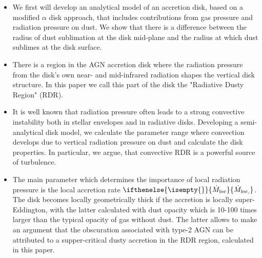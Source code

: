 \documentclass[12pt,english,preprint]{aastex}
\newcommand{\mdt}[1][]{ 
  \ifthenelse{\isempty{#1}}
  {\dot{M}_{\rm loc}}
  { {\dot M}_{\rm{loc},{#1}} } 
  } %
\begin{document}
\begin{itemize}
    \item  We first will develop an analytical model of an accretion disk, based on a modified 
    $\alpha$ disk approach, that includes  contributions from gas pressure 
    and radiation pressure on dust.   We show that there is a difference between the  
    radius of dust sublimation at the disk mid-plane and the radius at which dust 
    sublimes at the disk surface.  

    \item There is a region in the AGN accretion disk where the radiation pressure from the disk's own near- and mid-infrared 
    radiation shapes the vertical disk structure. In this paper we call this part of the disk the "Radiative Dusty Region" (RDR).

    \item It is well known that radiation pressure often leads to a strong convective instability both in stellar envelopes 
    and in radiative disks.   Developing a semi-analytical disk model,
    we calculate the parameter range where convection develops due to vertical radiation pressure on dust and calculate 
    the disk properties. In particular, we argue, that convective RDR is a powerful source of turbulence.

    \item The main parameter which determines the importance of local radiation pressure is the local accretion rate $\mdt$. 
    The disk becomes locally geometrically thick if the accretion is locally super-Eddington, with the latter calculated 
    with dust opacity which is 10-100 times larger than the typical opacity of gas without dust. 
    The latter allows to make an argument that the obscuration associated with type-2 AGN can be 
    attributed to a supper-critical dusty accretion in the RDR region, calculated in this paper.  
\end{itemize}
\end{document}
